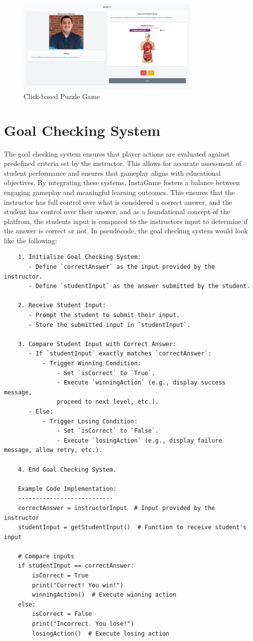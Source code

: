 \begin{figure}
	\centering
	\includegraphics[width=0.8\textwidth]{figures/Diagnose_Game/Diagnose_Game.jpeg}
	\caption{Click-based Puzzle Game}
	\label{fig:gameplayClickPuzzle}
\end{figure}

\section{Goal Checking System}
The goal checking system ensures that player actions are evaluated against predefined criteria set by the instructor. This allows for accurate assessment of student performance and ensures that gameplay aligns with educational objectives. By integrating these systems, InstaGame fosters a balance between engaging gameplay and meaningful learning outcomes. This ensures that the instructor has full control over what is considered a correct answer, and the student has control over their answer, and as a foundational concept of the platfrom, the students input is compared to the instructors input to determine if the answer is correct or not. In pseudocode, the goal checking system would look like the following:
\begin{verbatim}
	1. Initialize Goal Checking System:
	   - Define `correctAnswer` as the input provided by the instructor.
	   - Define `studentInput` as the answer submitted by the student.
	
	2. Receive Student Input:
	   - Prompt the student to submit their input.
	   - Store the submitted input in `studentInput`.
	
	3. Compare Student Input with Correct Answer:
	   - If `studentInput` exactly matches `correctAnswer`:
		   - Trigger Winning Condition:
			   - Set `isCorrect` to `True`.
			   - Execute `winningAction` (e.g., display success message, 
			   proceed to next level, etc.).
	   - Else:
		   - Trigger Losing Condition:
			   - Set `isCorrect` to `False`.
			   - Execute `losingAction` (e.g., display failure message, allow retry, etc.).
	
	4. End Goal Checking System.
	
	Example Code Implementation:
	---------------------------
	correctAnswer = instructorInput  # Input provided by the instructor
	studentInput = getStudentInput()  # Function to receive student's input
	
	# Compare inputs
	if studentInput == correctAnswer:
		isCorrect = True
		print("Correct! You win!")
		winningAction()  # Execute winning action
	else:
		isCorrect = False
		print("Incorrect. You lose!")
		losingAction()  # Execute losing action
	\end{verbatim}

